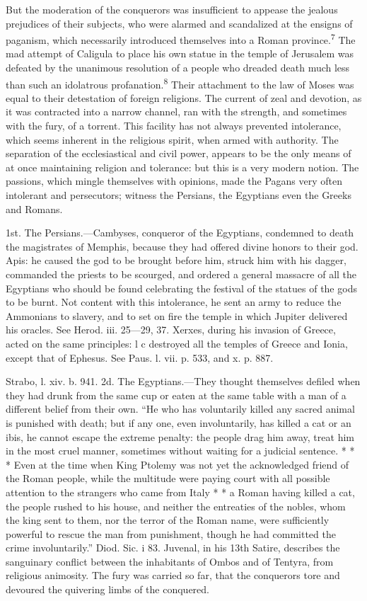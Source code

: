 But the moderation of the conquerors was insufficient to appease
the jealous prejudices of their subjects, who were alarmed and
scandalized at the ensigns of paganism, which necessarily
introduced themselves into a Roman province.\textsuperscript{7} The mad attempt of
Caligula to place his own statue in the temple of Jerusalem was
defeated by the unanimous resolution of a people who dreaded
death much less than such an idolatrous profanation.\textsuperscript{8} Their
attachment to the law of Moses was equal to their detestation of
foreign religions. The current of zeal and devotion, as it was
contracted into a narrow channel, ran with the strength, and
sometimes with the fury, of a torrent. This facility has not
always prevented intolerance, which seems inherent in the
religious spirit, when armed with authority. The separation of
the ecclesiastical and civil power, appears to be the only means
of at once maintaining religion and tolerance: but this is a very
modern notion. The passions, which mingle themselves with
opinions, made the Pagans very often intolerant and persecutors;
witness the Persians, the Egyptians even the Greeks and Romans.

1st. The Persians.—Cambyses, conqueror of the Egyptians,
condemned to death the magistrates of Memphis, because they had
offered divine honors to their god. Apis: he caused the god to be
brought before him, struck him with his dagger, commanded the
priests to be scourged, and ordered a general massacre of all the
Egyptians who should be found celebrating the festival of the
statues of the gods to be burnt. Not content with this
intolerance, he sent an army to reduce the Ammonians to slavery,
and to set on fire the temple in which Jupiter delivered his
oracles. See Herod. iii. 25—29, 37. Xerxes, during his invasion
of Greece, acted on the same principles: l c destroyed all the
temples of Greece and Ionia, except that of Ephesus. See Paus. l.
vii. p. 533, and x. p. 887.

Strabo, l. xiv. b. 941. 2d. The Egyptians.—They thought
themselves defiled when they had drunk from the same cup or eaten
at the same table with a man of a different belief from their
own. “He who has voluntarily killed any sacred animal is punished
with death; but if any one, even involuntarily, has killed a cat
or an ibis, he cannot escape the extreme penalty: the people drag
him away, treat him in the most cruel manner, sometimes without
waiting for a judicial sentence. * * * Even at the time when King
Ptolemy was not yet the acknowledged friend of the Roman people,
while the multitude were paying court with all possible attention
to the strangers who came from Italy * * a Roman having killed a
cat, the people rushed to his house, and neither the entreaties
of the nobles, whom the king sent to them, nor the terror of the
Roman name, were sufficiently powerful to rescue the man from
punishment, though he had committed the crime involuntarily.”
Diod. Sic. i 83. Juvenal, in his 13th Satire, describes the
sanguinary conflict between the inhabitants of Ombos and of
Tentyra, from religious animosity. The fury was carried so far,
that the conquerors tore and devoured the quivering limbs of the
conquered.

